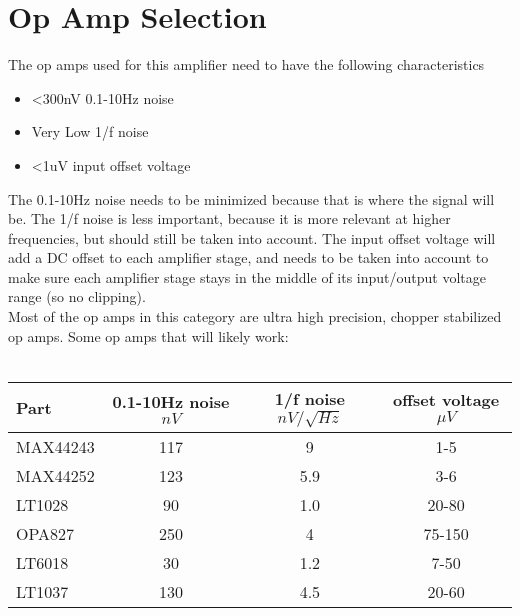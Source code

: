 \documentclass{article}
\begin{document}
\section{Op Amp Selection}
The op amps used for this amplifier need to have the following characteristics
\begin{itemize}
    \item \textless300nV 0.1-10Hz noise
    \item Very Low 1/f noise
    \item \textless1uV input offset voltage
\end{itemize}
The 0.1-10Hz noise needs to be minimized because that is where the signal will
be. The 1/f noise is less important, because it is more relevant at higher
frequencies, but should still be taken into account. The input offset voltage
will add a DC offset to each amplifier stage, and needs to be taken into
account to make sure each amplifier stage stays in the middle of its
input/output voltage range (so no clipping). \\ 
Most of the op amps in this category are ultra high precision, chopper
stabilized op amps. Some op amps that will likely work:\\ \\
\begin{tabular}{|l|c|c|c|}
    \hline
    Part & 0.1-10Hz noise $nV$ & 1/f noise $nV/\sqrt{Hz}$ & offset voltage $\mu V$ \\\hline
    MAX44243 & 117 & 9 & 1-5 \\\hline
    MAX44252 & 123 & 5.9 & 3-6 \\ \hline
    LT1028   & 90  & 1.0 & 20-80 \\ \hline
    OPA827   & 250 & 4 & 75-150 \\ \hline
    LT6018   & 30 & 1.2 & 7-50 \\ \hline
    LT1037   & 130 & 4.5 & 20-60 \\ \hline
\end{tabular}
    
\end{document}
